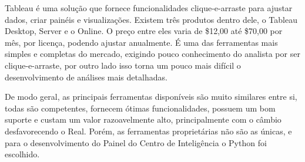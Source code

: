 Tableau é uma solução que fornece funcionalidades clique-e-arraste para ajustar dados, criar painéis e visualizações. Existem três produtos dentro dele, o Tableau Desktop, Server e o Online. O preço entre eles varia de \$12,00 até \$70,00 por mês, por licença, podendo ajustar anualmente. É uma das ferramentas mais simples e completas do mercado, exigindo pouco conhecimento do analista por ser clique-e-arraste, por outro lado isso torna um pouco mais difícil o desenvolvimento de análises mais detalhadas.

De modo geral, as principais ferramentas disponíveis são muito similares entre si, todas são competentes, fornecem ótimas funcionalidades, possuem um bom suporte e custam um valor razoavelmente alto, principalmente com o câmbio desfavorecendo o Real. Porém, as ferramentas proprietárias não são as únicas, e para o desenvolvimento do Painel do Centro de Inteligência o Python foi escolhido.





